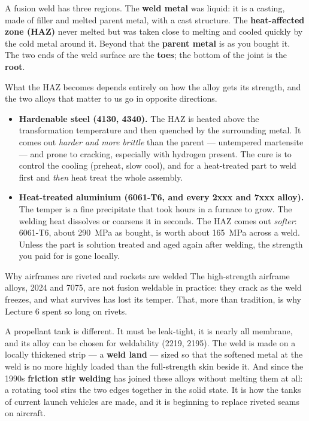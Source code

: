 \documentclass[11pt,a4paper]{article}
\begin{document}
A fusion weld has three regions. The \textbf{weld metal} was liquid: it is a casting, made of
filler and melted parent metal, with a cast structure. The \textbf{heat-affected zone (HAZ)} never
melted but was taken close to melting and cooled quickly by the cold metal around it. Beyond that
the \textbf{parent metal} is as you bought it. The two ends of the weld surface are the
\textbf{toes}; the bottom of the joint is the \textbf{root}.

\medskip
What the HAZ becomes depends entirely on how the alloy gets its strength, and the two alloys that
matter to us go in opposite directions.

\begin{itemize}[leftmargin=*,itemsep=3pt]
\item \textbf{Hardenable steel (4130, 4340).} The HAZ is heated above the transformation
  temperature and then quenched by the surrounding metal. It comes out \emph{harder and more
  brittle} than the parent --- untempered martensite --- and prone to cracking, especially with
  hydrogen present. The cure is to control the cooling (preheat, slow cool), and for a
  heat-treated part to weld first and \emph{then} heat treat the whole assembly.
\item \textbf{Heat-treated aluminium (6061-T6, and every 2xxx and 7xxx alloy).} The temper is a
  fine precipitate that took hours in a furnace to grow. The welding heat dissolves or coarsens it
  in seconds. The HAZ comes out \emph{softer}: 6061-T6, about \SI{290}{MPa} as bought, is worth
  about \SI{165}{MPa} across a weld. Unless the part is solution treated and aged again after
  welding, the strength you paid for is gone locally.
\end{itemize}

\begin{aerobox}{Why airframes are riveted and rockets are welded}
The high-strength airframe alloys, 2024 and 7075, are not fusion weldable in practice: they crack
as the weld freezes, and what survives has lost its temper. That, more than tradition, is why
Lecture 6 spent so long on rivets.

\medskip
A propellant tank is different. It must be leak-tight, it is nearly all membrane, and its alloy can
be chosen for weldability (2219, 2195). The weld is made on a locally thickened strip --- a
\textbf{weld land} --- sized so that the softened metal at the weld is no more highly loaded than
the full-strength skin beside it. And since the 1990s \textbf{friction stir welding} has joined
these alloys without melting them at all: a rotating tool stirs the two edges together in the solid
state. It is how the tanks of current launch vehicles are made, and it is beginning to replace
riveted seams on aircraft.
\end{aerobox}
\end{document}
